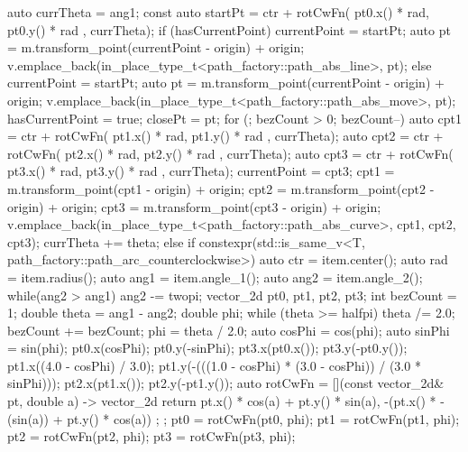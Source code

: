 \begin{codeblock}
{{{        auto currTheta = ang1;
        const auto startPt =
        ctr + rotCwFn({ pt0.x() * rad, pt0.y() * rad }, currTheta);
        if (hasCurrentPoint) {
          currentPoint = startPt;
          auto pt = m.transform_point(currentPoint - origin) + origin;
          v.emplace_back(in_place_type_t<path_factory::path_abs_line>, pt);
        }
        else {
          currentPoint = startPt;
          auto pt = m.transform_point(currentPoint - origin) + origin;
          v.emplace_back(in_place_type_t<path_factory::path_abs_move>, pt);
          hasCurrentPoint = true;
          closePt = pt;
        }
        for (; bezCount > 0; bezCount--) {
          auto cpt1 = ctr + rotCwFn({ pt1.x() * rad, pt1.y() * rad }, currTheta);
          auto cpt2 = ctr + rotCwFn({ pt2.x() * rad, pt2.y() * rad },
            currTheta);
          auto cpt3 = ctr + rotCwFn({ pt3.x() * rad, pt3.y() * rad },
            currTheta);
          currentPoint = cpt3;
          cpt1 = m.transform_point(cpt1 - origin) + origin;
          cpt2 = m.transform_point(cpt2 - origin) + origin;
          cpt3 = m.transform_point(cpt3 - origin) + origin;
          v.emplace_back(in_place_type_t<path_factory::path_abs_curve>, cpt1,
            cpt2, cpt3);
          currTheta += theta;
        }
      }
      else if constexpr(std::is_same_v<T, path_factory::path_arc_counterclockwise>) {
      {
        auto ctr = item.center();
        auto rad = item.radius();
        auto ang1 = item.angle_1();
        auto ang2 = item.angle_2();
        while(ang2 > ang1) {
          ang2 -= twopi;
        }
        vector_2d pt0, pt1, pt2, pt3;
        int bezCount = 1;
        double theta = ang1 - ang2;
        double phi;
        while (theta >= halfpi) {
          theta /= 2.0;
          bezCount += bezCount;
        }
        phi = theta / 2.0;
        auto cosPhi = cos(phi);
        auto sinPhi = sin(phi);
        pt0.x(cosPhi);
        pt0.y(-sinPhi);
        pt3.x(pt0.x());
        pt3.y(-pt0.y());
        pt1.x((4.0 - cosPhi) / 3.0);
        pt1.y(-(((1.0 - cosPhi) * (3.0 - cosPhi)) / (3.0 * sinPhi)));
        pt2.x(pt1.x());
        pt2.y(-pt1.y());
        auto rotCwFn = [](const vector_2d& pt, double a) -> vector_2d {
          return { pt.x() * cos(a) + pt.y() * sin(a),
            -(pt.x() * -(sin(a)) + pt.y() * cos(a)) };
        };
        pt0 = rotCwFn(pt0, phi);
        pt1 = rotCwFn(pt1, phi);
        pt2 = rotCwFn(pt2, phi);
        pt3 = rotCwFn(pt3, phi);
}}}}
\end{codeblock}
